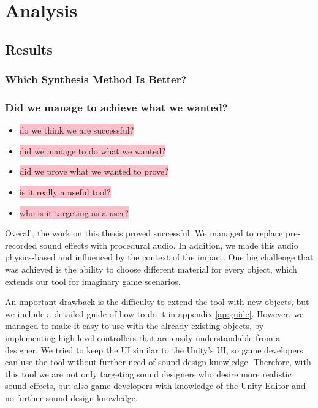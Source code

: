 \chapter{Analysis}\label{ch:analysis}

\section{Results}

\subsection{Which Synthesis Method Is Better?}

\subsection{Did we manage to achieve what we wanted?}
\begin{itemize}
\item \colorbox{pink}{do we think we are successful?}
\item \colorbox{pink}{did we manage to do what we wanted?}
\item \colorbox{pink}{did we prove what we wanted to prove?}
\item \colorbox{pink}{is it really a useful tool?}
\item \colorbox{pink}{who is it targeting as a user?}
\end{itemize} 

Overall, the work on this thesis proved successful. We managed to replace pre-recorded sound effects with procedural audio. In addition, we made this audio physics-based and influenced by the context of the impact. One big challenge that was achieved is the ability to choose different material for every object, which extends our tool for imaginary game scenarios. 

An important drawback is the difficulty to extend the tool with new objects, but we include a detailed guide of how to do it in appendix \ref{ap:guide}. However, we managed to make it easy-to-use with the already existing objects, by implementing high level controllers that are easily understandable from a designer. We tried to keep the UI similar to the Unity's UI, so game developers can use the tool without further need of sound design knowledge. Therefore, with this tool we are not only targeting sound designers who desire more realistic sound effects, but also game developers with knowledge of the Unity Editor and no further sound design knowledge.

